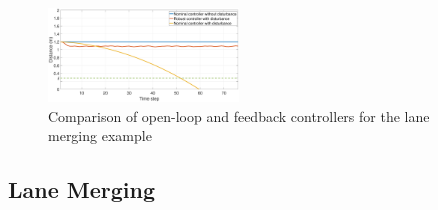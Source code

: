 %
%



\begin{figure}
	\centering
	\includegraphics[width=0.45\textwidth]{figures/Merge_plot2.eps}
	\caption{Comparison of open-loop and feedback controllers for the lane merging example}
	\label{fig:merging_distance}
	\vspace*{-0.3cm}
\end{figure}

\subsection{Lane Merging}
\label{sec:lane merging}

